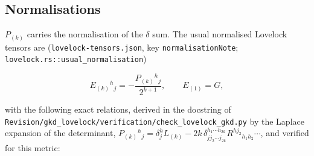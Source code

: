 \documentclass[11pt]{article}
\begin{document}
\subsection{Normalisations}

$P_{(k)}$ carries the normalisation of the $\delta$ sum. The usual normalised Lovelock tensors are (\texttt{lovelock\allowbreak{}-tensors\allowbreak{}.json}, key \texttt{normalis\allowbreak{}ationNot\allowbreak{}e}; \texttt{lovelock\allowbreak{}.rs::usu\allowbreak{}al\_norma\allowbreak{}lisation})

\[
E_{(k)}{}^h{}_j = -\frac{P_{(k)}{}^h{}_j}{2^{k+1}},\qquad E_{(1)} = G ,
\]

with the following exact relations, derived in the docstring of \texttt{Revision\allowbreak{}/gkd\_lov\allowbreak{}elock/ve\allowbreak{}rificati\allowbreak{}on/check\allowbreak{}\_loveloc\allowbreak{}k\_gkd.py} by the Laplace expansion of the determinant, $P_{(k)}{}^h{}_j = \delta^h_jL_{(k)} - 2k\,\delta^{h_1\cdots h_{2k}}_{jj_2\cdots j_{2k}}R^{hj_2}{}_{h_1h_2}\cdots$, and verified for this metric:
\end{document}
